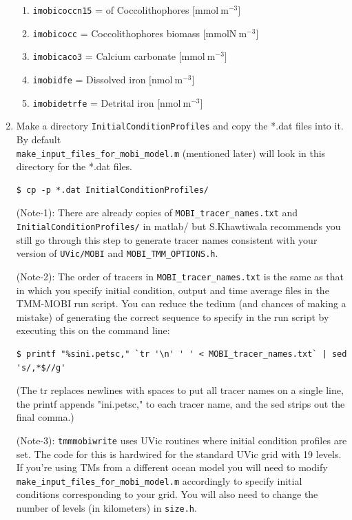 \documentclass[a4paper]{article}
\def\noin{\noindent }
\begin{document}
\begin{enumerate}
\begin{enumerate}[label=(\arabic*)]
	\item \verb|imobicoccn15| =  of Coccolithophores $[\mathrm{mmol \ m^{-3}]}$	
	\item \verb|imobicocc| = Coccolithophores biomass $[\mathrm{mmolN \ m^{-3}]}$
	\item \verb|imobicaco3| = Calcium carbonate $[\mathrm{mmol \ m^{-3}]}$
	\item \verb|imobidfe| = Dissolved iron $[\mathrm{nmol \ m^{-3}]}$
	\item \verb|imobidetrfe| = Detrital iron $[\mathrm{nmol \ m^{-3}]}$
\end{enumerate}

\item Make a directory \verb|InitialConditionProfiles| and copy the *.dat files into it. By default \\ \verb|make_input_files_for_mobi_model.m| (mentioned later) will look in this directory for the *.dat files.
\begin{lstlisting}[style=DOS]
 $ cp -p *.dat InitialConditionProfiles/
\end{lstlisting}

\noin (Note-1): There are already copies of \verb|MOBI_tracer_names.txt| and \verb|InitialConditionProfiles/| in matlab/ but S.Khawtiwala recommends you still go through this step to generate tracer names consistent with your version of \verb|UVic/MOBI| and \verb|MOBI_TMM_OPTIONS.h|.

\noin (Note-2): The order of tracers in \verb|MOBI_tracer_names.txt| is the same as that in which you specify initial condition, output and time average files in the TMM-MOBI run script. You can reduce the tedium (and chances of making a mistake) of generating the correct sequence to specify in the run script by executing this on the command line: 
\begin{lstlisting}[style=DOS]
 $ printf "%sini.petsc," `tr '\n' ' ' < MOBI_tracer_names.txt` | sed 's/,*$//g'
\end{lstlisting}
(The tr replaces newlines with spaces to put all tracer names on a single line, 
the printf appends "ini.petsc," to each tracer name, and the sed strips out the 
final comma.)

\noin (Note-3): \verb|tmmmobiwrite| uses UVic routines where initial condition profiles are set. The code for this is hardwired for the standard UVic grid with 19 levels. If you're using TMs from a different ocean model you will need to modify \verb|make_input_files_for_mobi_model.m| accordingly to specify initial conditions corresponding to your grid. You will also need to change the number of levels (in kilometers) in \verb|size.h|.


\end{enumerate}
\end{document}
